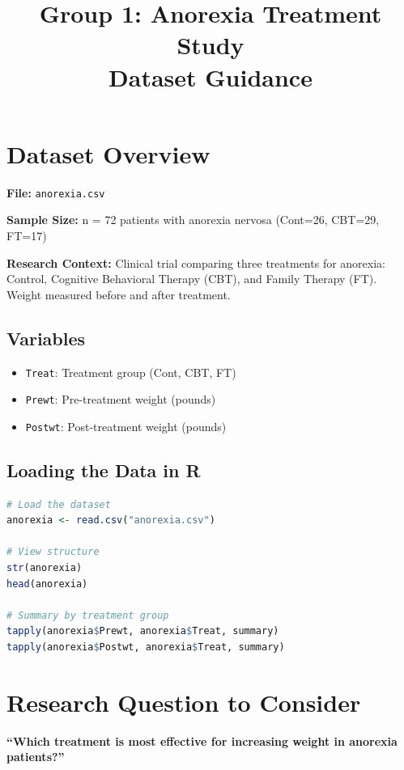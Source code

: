 \documentclass[11pt]{article}
\title{\textbf{Group 1: Anorexia Treatment Study}\\
\large{Dataset Guidance}}
\author{}
\date{}
\begin{document}
\maketitle

\section*{Dataset Overview}

\textbf{File:} \texttt{anorexia.csv}

\textbf{Sample Size:} n = 72 patients with anorexia nervosa (Cont=26, CBT=29, FT=17)

\textbf{Research Context:} Clinical trial comparing three treatments for anorexia: Control, Cognitive Behavioral Therapy (CBT), and Family Therapy (FT). Weight measured before and after treatment.

\subsection*{Variables}

\begin{itemize}
\item \texttt{Treat}: Treatment group (Cont, CBT, FT)
\item \texttt{Prewt}: Pre-treatment weight (pounds)
\item \texttt{Postwt}: Post-treatment weight (pounds)
\end{itemize}

\subsection*{Loading the Data in R}

\begin{lstlisting}[language=R, basicstyle=\small\ttfamily, breaklines=true]
# Load the dataset
anorexia <- read.csv("anorexia.csv")

# View structure
str(anorexia)
head(anorexia)

# Summary by treatment group
tapply(anorexia$Prewt, anorexia$Treat, summary)
tapply(anorexia$Postwt, anorexia$Treat, summary)
\end{lstlisting}

\section*{Research Question to Consider}

\textbf{``Which treatment is most effective for increasing weight in anorexia patients?''}
\end{document}

